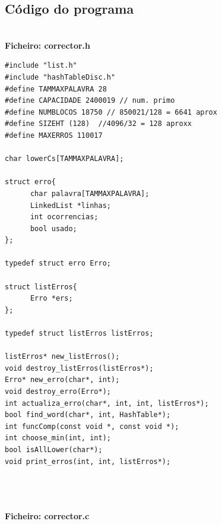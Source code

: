 \subsection{Código do programa}

\textbf{\\Ficheiro: corrector.h}

\begin{verbatim}
#include "list.h"
#include "hashTableDisc.h"
#define TAMMAXPALAVRA 28
#define CAPACIDADE 2400019 // num. primo
#define NUMBLOCOS 18750 // 850021/128 = 6641 aprox
#define SIZEHT (128)  //4096/32 = 128 aproxx
#define MAXERROS 110017

char lowerCs[TAMMAXPALAVRA];

struct erro{
      char palavra[TAMMAXPALAVRA];
      LinkedList *linhas;
      int ocorrencias;
      bool usado;
};

typedef struct erro Erro;

struct listErros{
      Erro *ers;
};

typedef struct listErros listErros;

listErros* new_listErros();
void destroy_listErros(listErros*);
Erro* new_erro(char*, int);
void destroy_erro(Erro*);
int actualiza_erro(char*, int, int, listErros*);
bool find_word(char*, int, HashTable*);
int funcComp(const void *, const void *);
int choose_min(int, int);
bool isAllLower(char*);
void print_erros(int, int, listErros*);

\end{verbatim}


\textbf{\\\\\\Ficheiro: corrector.c}

